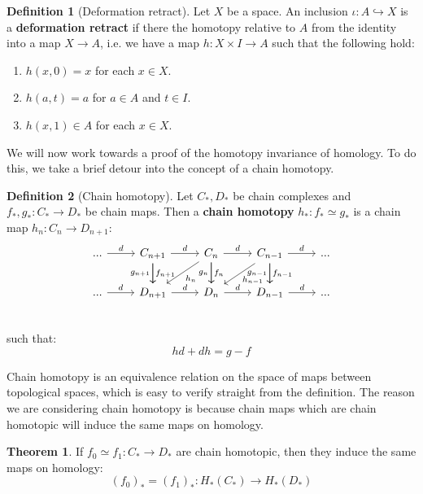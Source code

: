 \documentclass[11pt, oneside]{amsart}   	%
\theoremstyle{definition}
\newtheorem{definition}{Definition}[section]
\newtheorem{theorem}{Theorem}[section]
\begin{document}
\begin{definition}[Deformation retract]
	Let $X$ be a space. An inclusion $\iota : A\hookrightarrow X$ is a \textbf{deformation retract} if there the homotopy 
	relative to $A$ from the identity into a map $X\rightarrow A$, i.e. we have a map $h : X\times I\rightarrow A$ such that 
	the following hold:
	\begin{enumerate}
		\item $h(x, 0) = x$ for each $x\in X$.
		\item $h(a, t) = a$ for $a\in A$ and $t\in I$.
		\item $h(x, 1)\in A$ for each $x\in X$. 
	\end{enumerate}
\end{definition}

We will now work towards a proof of the homotopy invariance of homology. To do this, we take a brief detour into the concept 
of a chain homotopy.

\begin{definition}[Chain homotopy]
	Let $C_*, D_*$ be chain complexes and $f_*, g_* : C_*\rightarrow D_*$ be chain maps. Then a \textbf{chain homotopy} 
	$h_* : f_*\simeq g_*$ is a chain map $h_n : C_n\rightarrow D_{n + 1}$:
	\[\begin{tikzcd}
	...\arrow[r, "d"] & C_{n + 1}\arrow[r, "d"]\arrow[d, "f_{n + 1}"]\arrow[d, swap, "g_{n + 1}"] & C_n\arrow[r, "d"]\arrow[d, "f_n"]
	\arrow[d, swap, "g_n"]\arrow[ld, "h_n"] & C_{n - 1}\arrow[r, "d"]\arrow[d, "f_{n - 1}"]\arrow[d, swap, "g_{n - 1}"]\arrow[ld, 
	"h_{n - 1}"] & ... \\
	...\arrow[r, "d"] & D_{n + 1}\arrow[r, "d"] & D_n\arrow[r, "d"] & D_{n - 1}\arrow[r, "d"] & ... \\
	\end{tikzcd}\]
	such that:
	\begin{equation}
		hd + dh = g - f
	\end{equation}
\end{definition}

Chain homotopy is an equivalence relation on the space of maps between topological spaces, which is easy to verify 
straight from the definition. The reason we are considering chain homotopy is because chain maps which are chain 
homotopic will induce the same maps on homology. 

\begin{theorem}
	If $f_0\simeq f_1 : C_*\rightarrow D_*$ are chain homotopic, then they induce the same maps on homology:
	\begin{equation}
		(f_0)_* = (f_1)_* : H_*(C_*)\rightarrow H_*(D_*)
	\end{equation}
\end{theorem}
\end{document}
